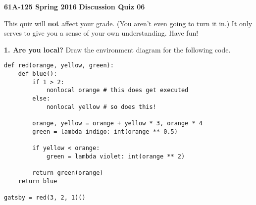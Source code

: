 \documentclass[11pt]{article}
\begin{document}
\textbf{61A-125 Spring 2016}\newline
\textbf{Discussion Quiz 06}\newline

This quiz will \textbf{not} affect your grade. (You aren't even going to turn it in.)\newline
It only serves to give you a sense of your own understanding. Have fun!\newline

\textbf{1. Are you local?}\newline
Draw the environment diagram for the following code.

\begin{lstlisting}
def red(orange, yellow, green):
    def blue():
        if 1 > 2:
            nonlocal orange # this does get executed
        else:
            nonlocal yellow # so does this!
        
        orange, yellow = orange + yellow * 3, orange * 4
        green = lambda indigo: int(orange ** 0.5)
        
        if yellow < orange:
            green = lambda violet: int(orange ** 2)
        
        return green(orange)
    return blue

gatsby = red(3, 2, 1)()
\end{lstlisting}
\end{document}

